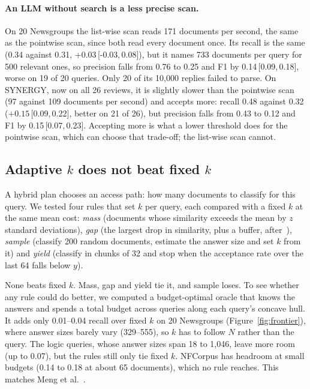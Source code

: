 \documentclass[11pt]{article}
\newcommand{\ci}[2]{\,[#1,\,#2]}
\begin{document}
\paragraph{An LLM without search is a less precise scan.}
On 20 Newsgroups the list-wise scan reads 171 documents per second, the same as
the pointwise scan, since both read every document once. Its recall is the same
(0.34 against 0.31, $+0.03$\ci{-0.03}{0.08}), but it names 733 documents
per query for 500 relevant ones, so precision falls from 0.76 to 0.25 and F1 by
0.14\ci{0.09}{0.18}, worse on 19 of 20 queries. Only 20 of its 10,000 replies
failed to parse. On SYNERGY, now on all 26 reviews, it is slightly slower than the
pointwise scan (97 against 109 documents per second) and accepts more: recall
0.48 against 0.32 ($+0.15$\ci{0.09}{0.22}, better on 21 of 26), but precision
falls from 0.43 to 0.12 and F1 by 0.15\ci{0.07}{0.23}. Accepting more is what a
lower threshold does for the pointwise scan, which can choose that trade-off;
the list-wise scan cannot.

\subsection{Adaptive $k$ does not beat fixed $k$}
\label{sec:adaptive}

A hybrid plan chooses an access path: how many documents to classify for this
query. We tested four rules that set $k$ per query, each compared with a fixed
$k$ at the same mean cost: \emph{mass} (documents whose similarity exceeds the
mean by $z$ standard deviations), \emph{gap} (the largest drop in similarity,
plus a buffer, after~\cite{taguchi2025adaptivek}), \emph{sample} (classify 200
random documents, estimate the answer size and set $k$ from it) and
\emph{yield} (classify in chunks of 32 and stop when the acceptance rate over
the last 64 falls below $y$).

None beats fixed $k$. Mass, gap and yield tie it, and sample loses. To see
whether any rule could do better, we computed a budget-optimal oracle that
knows the answers and spends a total budget across queries along each query's
concave hull. It adds only 0.01--0.04 recall over fixed $k$ on 20 Newsgroups
(Figure~\ref{fig:frontier}), where answer sizes barely vary (329--555), so $k$
has to follow $N$ rather than the query. The logic queries, whose answer sizes
span 18 to 1,046, leave more room (up to 0.07), but the rules still only tie
fixed $k$. NFCorpus has headroom at small budgets (0.14 to 0.18 at about 65
documents), which no rule reaches. This matches Meng et al.~\cite{meng2024rlt}.
\end{document}
